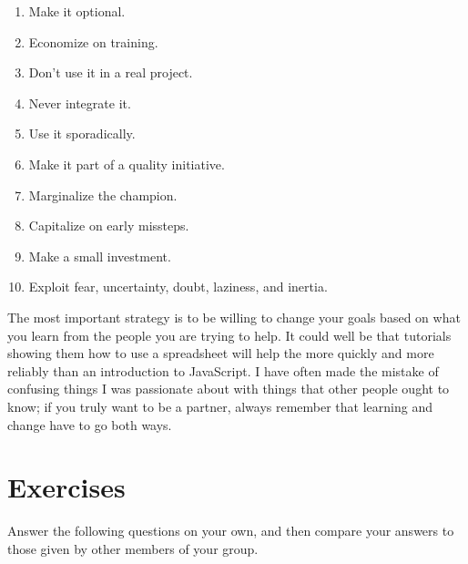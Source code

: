 \begin{enumerate}

\item
  Make it optional.

\item
  Economize on training.

\item
  Don't use it in a real project.

\item
  Never integrate it.

\item
  Use it sporadically.

\item
  Make it part of a quality initiative.

\item
  Marginalize the champion.

\item
  Capitalize on early missteps.

\item
  Make a small investment.

\item
  Exploit fear, uncertainty, doubt, laziness, and inertia.

\end{enumerate}

The most important strategy is to be willing to change your goals
based on what you learn from the people you are trying to help.  It
could well be that tutorials showing them how to use a spreadsheet
will help the more quickly and more reliably than an introduction to
JavaScript.  I have often made the mistake of confusing things I was
passionate about with things that other people ought to know; if you
truly want to be a partner, always remember that learning and change
have to go both ways.

\section{Exercises}\label{s:partner-exercises}


Answer the following questions on your own, and then compare your
answers to those given by other members of your group.

